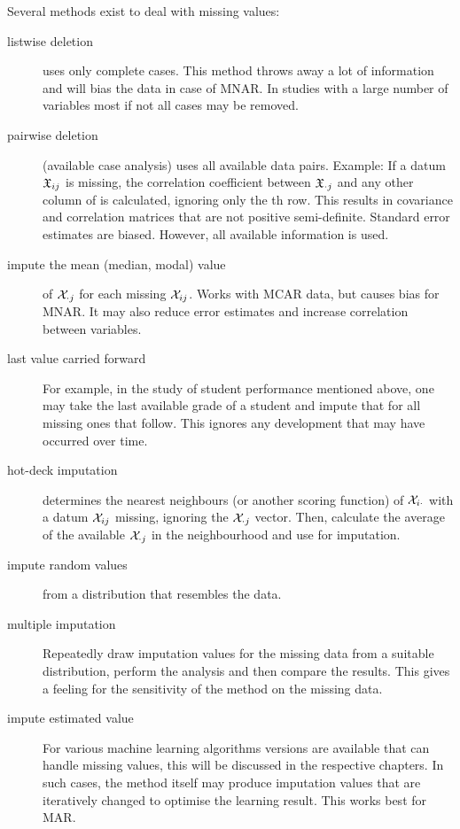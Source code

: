 \begin{refsection}
Several methods exist to deal with missing values:
\begin{description}
  \item[listwise deletion]{uses only complete cases. This method throws away a lot of information and will bias the data in case of \acs{MNAR}. In studies with a large number of variables  most if not all cases may be removed.}
  \item[pairwise deletion]{(available case analysis) uses all available data pairs. Example: If a datum \(\mathfrak{X}_{ij} \) is missing, the correlation coefficient between \(\mathfrak{X}_{\cdot j} \) and any other column of  is calculated, ignoring only the th row. This results in covariance and correlation matrices that are not positive semi-definite. Standard error estimates are biased. However, all available information is used.}
  \item[impute the mean (median, modal) value]{ of \(\mathcal{X}_{\cdot j} \) for each missing \(\mathcal{X}_{ij} \). Works with \acs{MCAR} data, but causes bias for \acs{MNAR}. It may also reduce error estimates and increase correlation between variables.}
  \item[last value  carried  forward]{For example, in the study of student performance mentioned above, one may take the last available grade of a student and impute that for all missing ones that follow. This ignores any development that may have occurred over time.}
  \item[hot-deck imputation]{determines the  nearest neighbours (or another scoring function) of \(\mathcal{X}_{i\cdot} \) with a datum \(\mathcal{X}_{ij} \) missing, ignoring the \(\mathcal{X}_{\cdot j} \) vector. Then, calculate the average of the available \(\mathcal{X}_{\cdot j} \) in the neighbourhood and use for imputation.}
  \item[impute random values]{from a distribution that resembles the data. }
  \item[multiple imputation]{Repeatedly draw imputation values for the missing data from a suitable distribution, perform the analysis and then compare the results. This gives a feeling for the sensitivity of the method on the missing data.}
  \item[impute estimated value]{For various machine learning algorithms versions are available that can handle missing values, this will be discussed in the respective chapters. In such cases, the method itself may produce imputation values that are iteratively changed to optimise the learning result. This works best for \acs{MAR}.}
\end{description}

\printbibliography[heading=subbibliography]
\end{refsection}
